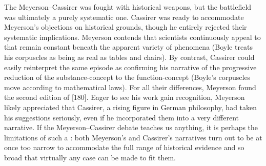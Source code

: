 \documentclass[submitted,12pt]{article}
\begin{document}
The Meyerson--Cassirer  was fought with historical weapons, but the battlefield was ultimately a purely systematic one. Cassirer was ready to accommodate Meyerson’s objections on historical grounds, though he entirely rejected their systematic implications. Meyerson contends that scientists continuously appeal to  that remain constant beneath the apparent variety of phenomena (Boyle treats his corpuscles as being as real as tables and chairs). By contrast, Cassirer could easily reinterpret the same episode as confirming his narrative of the progressive reduction of the substance-concept to the function-concept (Boyle's corpuscles move according to mathematical laws). For all their differences, Meyerson found the second edition of \EPt {} [180]. Eager to see his work gain recognition, Meyerson likely appreciated that Cassirer, a rising figure in German philosophy, had taken his suggestions seriously, even if he incorporated them into a very different narrative. If the Meyerson--Cassirer debate teaches us anything, it is perhaps the limitations of such a : both Meyerson's and Cassirer's narratives turn out to be at once too narrow to accommodate the full range of historical evidence and so broad that virtually any case can be made to fit them.
\end{document}
